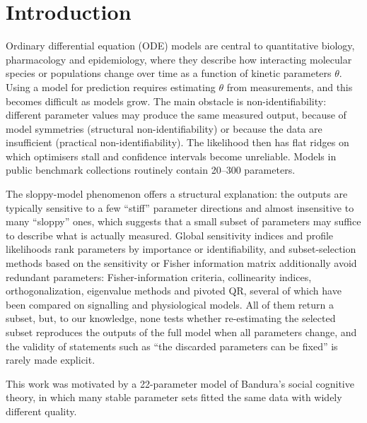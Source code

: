 \documentclass[pdflatex,sn-nature]{sn-jnl}
\theoremstyle{plain}
\begin{document}
\section*{Introduction}\label{sec:intro}

Ordinary differential equation (ODE) models are central to quantitative biology, pharmacology and epidemiology, where they describe how interacting molecular species or populations change over time as a function of kinetic parameters $\theta$\cite{bib16}. Using a model for prediction requires estimating $\theta$ from measurements, and this becomes difficult as models grow. The main obstacle is non-identifiability: different parameter values may produce the same measured output, because of model symmetries (structural non-identifiability) or because the data are insufficient (practical non-identifiability)\cite{bib4,bib10,bib29,bib49,bib50}. The likelihood then has flat ridges on which optimisers stall and confidence intervals become unreliable\cite{bib24,bib25,bib17}. Models in public benchmark collections routinely contain 20--300 parameters\cite{bib31}.

The sloppy-model phenomenon offers a structural explanation\cite{bib15,bib41}: the outputs are typically sensitive to a few ``stiff'' parameter directions and almost insensitive to many ``sloppy'' ones\cite{bib53}, which suggests that a small subset of parameters may suffice to describe what is actually measured. Global sensitivity indices\cite{bib26,bib23} and profile likelihoods\cite{bib24,bib37,bib51} rank parameters by importance or identifiability, and subset-selection methods based on the sensitivity or Fisher information matrix additionally avoid redundant parameters\cite{bib5}: Fisher-information criteria\cite{bib42,bib46}, collinearity indices\cite{bib9,bib38}, orthogonalization\cite{bib43,bib44,bib45}, eigenvalue methods\cite{bib47} and pivoted QR\cite{bib40,bib54}, several of which have been compared on signalling and physiological models\cite{bib47,bib48}. All of them return a subset, but, to our knowledge, none tests whether re-estimating the selected subset reproduces the outputs of the full model when all parameters change, and the validity of statements such as ``the discarded parameters can be fixed'' is rarely made explicit.

This work was motivated by a 22-parameter model of Bandura's social cognitive theory\cite{bib3,bib55,bib56,bib34}, in which many stable parameter sets fitted the same data with widely different quality\cite{bib35}.
\end{document}

